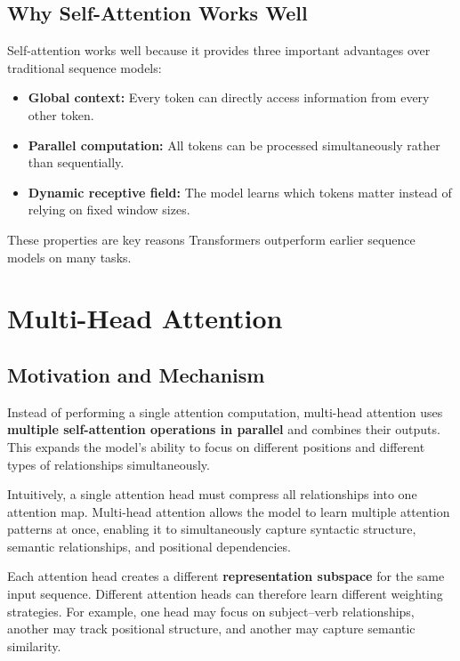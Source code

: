 \documentclass[11pt]{article}
\begin{document}
\subsection{Why Self-Attention Works Well}

Self-attention works well because it provides three important advantages over traditional sequence models:

\begin{itemize}

\item \textbf{Global context:}
Every token can directly access information from every other token.

\item \textbf{Parallel computation:}
All tokens can be processed simultaneously rather than sequentially.

\item \textbf{Dynamic receptive field:}
The model learns which tokens matter instead of relying on fixed window sizes.

\end{itemize}

These properties are key reasons Transformers outperform earlier sequence models on many tasks.

\section{Multi-Head Attention}

\subsection{Motivation and Mechanism}

Instead of performing a single attention computation, multi-head attention uses \textbf{multiple self-attention operations in parallel} and combines their outputs. This expands the model's ability to focus on different positions and different types of relationships simultaneously.

Intuitively, a single attention head must compress all relationships into one attention map. Multi-head attention allows the model to learn multiple attention patterns at once, enabling it to simultaneously capture syntactic structure, semantic relationships, and positional dependencies.

Each attention head creates a different \textbf{representation subspace} for the same input sequence. Different attention heads can therefore learn different weighting strategies. For example, one head may focus on subject–verb relationships, another may track positional structure, and another may capture semantic similarity.
\end{document}
